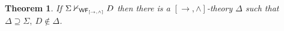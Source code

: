 \documentclass[12pt]{article}
\newtheorem{thm}{Theorem}[section]
\newtheorem{prop}[thm]{Proposition}
\begin{document}



\begin{thm}
\label{c}
If $ \Sigma \nvdash_{{\sf WF_{[\rightarrow, \wedge]}} } D$ then there is a $[\rightarrow , \wedge]$-theory $ \Delta $ such that $\Delta \supseteq \Sigma, ~D \notin \Delta$.
\end{thm}
\end{document}
